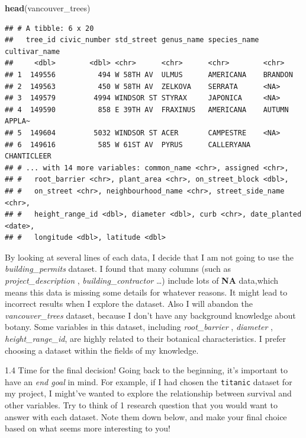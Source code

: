 \documentclass[
]{article}
\newenvironment{Shaded}{\begin{snugshade}}{\end{snugshade}}
\newcommand{\KeywordTok}[1]{\textcolor[rgb]{0.13,0.29,0.53}{\textbf{#1}}}
\newcommand{\NormalTok}[1]{#1}
\begin{document}
\begin{Shaded}
\begin{Highlighting}[]
\KeywordTok{head}\NormalTok{(vancouver\_trees)}
\end{Highlighting}
\end{Shaded}

\begin{verbatim}
## # A tibble: 6 x 20
##   tree_id civic_number std_street genus_name species_name cultivar_name
##     <dbl>        <dbl> <chr>      <chr>      <chr>        <chr>        
## 1  149556          494 W 58TH AV  ULMUS      AMERICANA    BRANDON      
## 2  149563          450 W 58TH AV  ZELKOVA    SERRATA      <NA>         
## 3  149579         4994 WINDSOR ST STYRAX     JAPONICA     <NA>         
## 4  149590          858 E 39TH AV  FRAXINUS   AMERICANA    AUTUMN APPLA~
## 5  149604         5032 WINDSOR ST ACER       CAMPESTRE    <NA>         
## 6  149616          585 W 61ST AV  PYRUS      CALLERYANA   CHANTICLEER  
## # ... with 14 more variables: common_name <chr>, assigned <chr>,
## #   root_barrier <chr>, plant_area <chr>, on_street_block <dbl>,
## #   on_street <chr>, neighbourhood_name <chr>, street_side_name <chr>,
## #   height_range_id <dbl>, diameter <dbl>, curb <chr>, date_planted <date>,
## #   longitude <dbl>, latitude <dbl>
\end{verbatim}

By looking at several lines of each data, I decide that I am not going
to use the \emph{building\_permits} dataset. I found that many columns
(such as \emph{project\_description} , \emph{building\_contractor}
\ldots) include lots of \textbf{NA} data,which means this data is
missing some details for whatever reasons. It might lead to incorrect
results when I explore the dataset. Also I will abandon the
\emph{vancouver\_trees} dataset, because I don't have any background
knowledge about botany. Some variables in this dataset, including
\emph{root\_barrier} , \emph{diameter} , \emph{height\_range\_id}, are
highly related to their botanical characteristics. I prefer choosing a
dataset within the fields of my knowledge.

1.4 Time for the final decision! Going back to the beginning, it's
important to have an \emph{end goal} in mind. For example, if I had
chosen the \texttt{titanic} dataset for my project, I might've wanted to
explore the relationship between survival and other variables. Try to
think of 1 research question that you would want to answer with each
dataset. Note them down below, and make your final choice based on what
seems more interesting to you!
\end{document}
